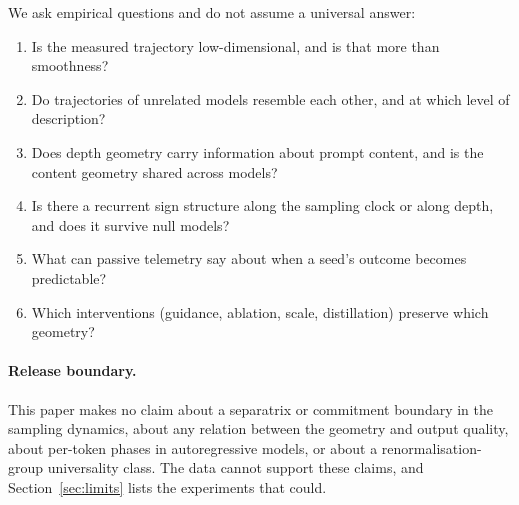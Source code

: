 \documentclass[11pt]{article}
\begin{document}
We ask empirical questions and do not assume a universal answer:
\begin{enumerate}
 \item Is the measured trajectory low-dimensional, and is that more than smoothness?
 \item Do trajectories of unrelated models resemble each other, and at which level of description?
 \item Does depth geometry carry information about prompt content, and is the content geometry shared across models?
 \item Is there a recurrent sign structure along the sampling clock or along depth, and does it survive null models?
 \item What can passive telemetry say about when a seed's outcome becomes predictable?
 \item Which interventions (guidance, ablation, scale, distillation) preserve which geometry?
\end{enumerate}

\paragraph{Release boundary.} This paper makes no claim about a separatrix or commitment boundary in the sampling dynamics, about any relation between the geometry and output quality, about per-token phases in autoregressive models, or about a renormalisation-group universality class. The data cannot support these claims, and Section~\ref{sec:limits} lists the experiments that could.
\end{document}
